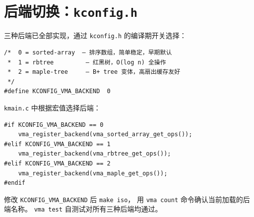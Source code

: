 \section{后端切换：\texttt{kconfig.h}}

三种后端已全部实现，通过 \texttt{kconfig.h} 的编译期开关选择：

\begin{lstlisting}[style=cstyle]
/*  0 = sorted-array  — 排序数组，简单稳定，早期默认
 *  1 = rbtree         — 红黑树，O(log n) 全操作
 *  2 = maple-tree     — B+ tree 变体，高扇出缓存友好
 */
#define KCONFIG_VMA_BACKEND  0
\end{lstlisting}

\texttt{kmain.c} 中根据宏值选择后端：

\begin{lstlisting}[style=cstyle]
#if KCONFIG_VMA_BACKEND == 0
    vma_register_backend(vma_sorted_array_get_ops());
#elif KCONFIG_VMA_BACKEND == 1
    vma_register_backend(vma_rbtree_get_ops());
#elif KCONFIG_VMA_BACKEND == 2
    vma_register_backend(vma_maple_get_ops());
#endif
\end{lstlisting}

修改 \texttt{KCONFIG\_VMA\_BACKEND} 后 \texttt{make iso}，
用 \texttt{vma count} 命令确认当前加载的后端名称。
\texttt{vma test} 自测试对所有三种后端均通过。


